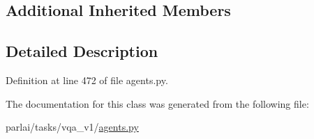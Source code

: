 \subsection*{Additional Inherited Members}


\subsection{Detailed Description}


Definition at line 472 of file agents.\+py.



The documentation for this class was generated from the following file\+:\begin{DoxyCompactItemize}
\item 
parlai/tasks/vqa\+\_\+v1/\hyperlink{parlai_2tasks_2vqa__v1_2agents_8py}{agents.\+py}\end{DoxyCompactItemize}
